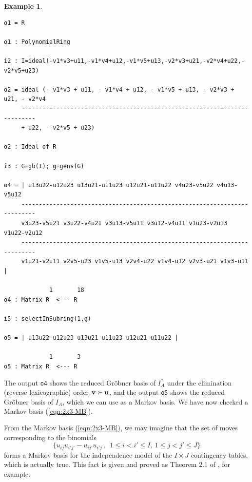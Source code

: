\documentclass[12pt]{article}
\theoremstyle{definition}
\newtheorem{Example}[Theorem]{Example}
\def\Bu{{\bf u}}
\def\Bv{{\bf v}}
\begin{document}
\begin{Example}
{\begin{verbatim}
o1 = R

o1 : PolynomialRing

i2 : I=ideal(-v1*v3+u11,-v1*v4+u12,-v1*v5+u13,-v2*v3+u21,-v2*v4+u22,-v2*v5+u23)

o2 = ideal (- v1*v3 + u11, - v1*v4 + u12, - v1*v5 + u13, - v2*v3 + u21, - v2*v4
     --------------------------------------------------------------------------
     + u22, - v2*v5 + u23)

o2 : Ideal of R

i3 : G=gb(I); g=gens(G)

o4 = | u13u22-u12u23 u13u21-u11u23 u12u21-u11u22 v4u23-v5u22 v4u13-v5u12
     --------------------------------------------------------------------------
     v3u23-v5u21 v3u22-v4u21 v3u13-v5u11 v3u12-v4u11 v1u23-v2u13 v1u22-v2u12
     --------------------------------------------------------------------------
     v1u21-v2u11 v2v5-u23 v1v5-u13 v2v4-u22 v1v4-u12 v2v3-u21 v1v3-u11 |

             1       18
o4 : Matrix R  <--- R

i5 : selectInSubring(1,g)

o5 = | u13u22-u12u23 u13u21-u11u23 u12u21-u11u22 |

             1       3
o5 : Matrix R  <--- R
\end{verbatim}
}
The output \verb|o4| shows the reduced Gr\"obner basis of $I_A^*$ under the
 elimination (reverse lexicographic) order $\Bv \succ \Bu$, and the
 output \verb|o5| shows the reduced Gr\"obner basis of $I_A$, which we
 can use as a Markov basis. We have now checked a Markov basis
 (\ref{eqn:2x3-MB}). 
\end{Example}

From the Markov basis (\ref{eqn:2x3-MB}), we may imagine that the set of
moves corresponding to the binomials
\[
\{ u_{ij}u_{i'j'} - u_{ij'}u_{i'j}\ ,\ \ 1 \leq i < i' \leq I,\ 1 \leq j <
j' \leq J\}
\]
forms a Markov basis for the independence model of the $I\times J$
contingency tables, which is actually true. This fact is given and
proved as
Theorem 2.1 of \cite{Aoki-Hara-Takemura-2012}, for example.
\end{document}
